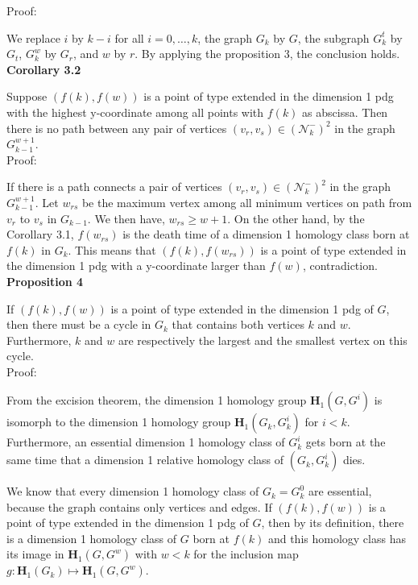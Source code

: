 \documentclass[a4paper,12pt]{article}
\numberwithin{equation}{section}
\begin{document}
	\noindent Proof: 
	
	We replace $i$ by $k-i$ for all $i=0,\ldots,k$, the graph $G_k$ by $G$, the subgraph $G^t_k$ by $G_t$, $G^w_k$ by $G_r$, and $w$ by $r$. By applying the proposition 3, the conclusion holds.\\
	
	\noindent \textbf{Corollary 3.2}
	
	Suppose $(f(k),f(w))$ is a point of type extended in the dimension 1 pdg with the highest y-coordinate among all points with $f(k)$ as abscissa. Then there is no path between any pair of vertices $(v_r,v_s) \in (\mathcal{N}^-_k)^2$ in the graph $G_{k-1}^{w+1}$.\\
	
	\noindent Proof:
	
	If there is a path connects a pair of vertices $(v_r,v_s) \in (\mathcal{N}^-_k)^2$ in the graph $G_{k-1}^{w+1}$. Let $w_{rs}$ be the maximum vertex among all minimum vertices on path from $v_r$ to $v_s$ in $G_{k-1}$. We then have, $w_{rs} \geq w+1$. On the other hand, by the Corollary 3.1, $f(w_{rs})$ is the death time of a dimension 1 homology class born at $f(k)$ in $G_k$. This means that $(f(k),f(w_{rs}))$ is a point of type extended in the dimension 1 pdg with a y-coordinate larger than $f(w)$, contradiction.\\
		
	
		
	\noindent \textbf{Proposition 4}
	
	If $(f(k),f(w))$ is a point of type extended in the dimension 1 pdg of $G$, then there must be a cycle in $G_k$ that contains both vertices $k$ and $w$. Furthermore, $k$ and $w$ are respectively the largest and the smallest vertex on this cycle.\\
	
	\noindent Proof: 
	
	From the excision theorem, the dimension 1 homology group $\mathbf{H}_1(G,G^i)$ is isomorph to the dimension 1 homology group $\mathbf{H}_1(G_k, G_k^i)$ for $i < k$. Furthermore, an essential dimension 1 homology class of $G^i_k$ gets born at the same time that a dimension 1 relative homology class of $(G_k, G_k^i)$ dies. 
	
	We know that every dimension 1 homology class of $G_k = G^0_k$ are essential, because the graph contains only vertices and edges. If $(f(k),f(w))$ is a point of type extended in the dimension 1 pdg of $G$, then by its definition, there is a dimension 1 homology class of $G$ born at $f(k)$ and this homology class has its image in $\mathbf{H}_1(G,G^w)$ with $w<k$ for the inclusion map $g: \mathbf{H}_1(G_k) \mapsto \mathbf{H}_1(G,G^w)$.  
	
\end{document}
